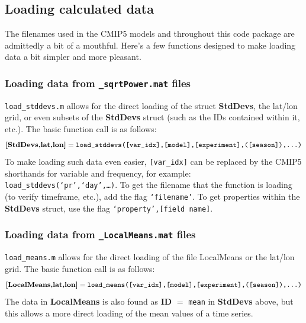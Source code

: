 \documentclass{article}
\begin{document}
\subsection{Loading calculated data}
The filenames used in the CMIP5 models and throughout this code package are admittedly a bit of a mouthful. Here's a few functions designed to make loading data a bit simpler and more pleasant.
\subsubsection{Loading data from \texttt{\_sqrtPower.mat} files}
\texttt{load\_stddevs.m} allows for the direct loading of the struct \textbf{StdDevs}, the lat/lon grid, or even subsets of the \textbf{StdDevs} struct (such as the IDs contained within it, etc.). The basic function call is as follows:
\begin{equation}
\textbf{[StdDevs,lat,lon]} = \texttt{load\_stddevs([var\_idx],[model],[experiment],([season]),\dots)}
\end{equation}
To make loading such data even easier, \texttt{[var\_idx]} can be replaced by the CMIP5 shorthands for variable and frequency, for example: \texttt{load\_stddevs(`pr',`day',\dots)}. To get the filename that the function is loading (to verify timeframe, etc.), add the flag \texttt{`filename'}. To get properties within the \textbf{StdDevs} struct, use the flag \texttt{`property',[field name]}. 

\subsubsection{Loading data from \texttt{\_LocalMeans.mat} files}
\texttt{load\_means.m} allows for the direct loading of the file LocalMeans or the lat/lon grid. The basic function call is as follows:
\begin{equation}
\textbf{[LocalMeans,lat,lon]} = \texttt{load\_means([var\_idx],[model],[experiment],([season]),\dots)}
\end{equation}
The data in \textbf{LocalMeans} is also found as \textbf{ID} $=$ \texttt{mean} in \textbf{StdDevs} above, but this allows a more direct loading of the mean values of a time series. 
\end{document}
